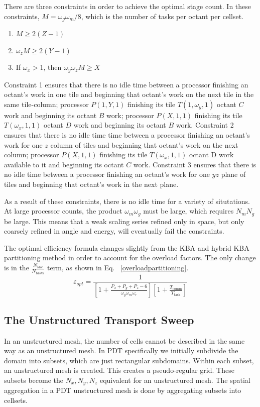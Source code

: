 \documentclass{anstrans}
\begin{document}
There are three constraints in order to achieve the optimal stage count. In these constraints, $M = \omega_g \omega_m/8$, which is the number of tasks per octant per cellset.
\begin{enumerate}
\item $ M \geq 2(Z-1)$
\item $\omega_z M \geq 2(Y-1)$
\item If $\omega_x > 1$, then $\omega_y \omega_z M \geq X$
\end{enumerate}
Constraint 1 ensures that there is no idle time between a processor finishing an octant's work in one tile and beginning that octant's work on the next tile in the same tile-column; processor $P(1,Y,1)$ finishing its tile $T(1,\omega_y,1)$ octant $C$ work and beginning its octant $B$ work; processor $P(X,1,1)$ finishing its tile $T(\omega_x,1,1)$ octant $D$ work and beginning its octant $B$ work. Constraint 2 ensures that there is no idle time time between a processor finishing an octant's work for one $z$ column of tiles and beginning that octant's work on the next column; processor $P(X,1,1)$ finishing its tile $T(\omega_x,1,1)$ octant D work available to it and beginning its octant $C$ work. Constraint 3 ensures that there is no idle time between a processor finishing an octant's work for one $yz$ plane of tiles and beginning that octant's work in the next plane.

As a result of these constraints, there is no idle time for a variety of situtations. At large processor counts, the product $\omega_m \omega_g$ must be large, which requires $N_m N_g$ be large. This means that a weak scaling series refined only in space, but only coarsely refined in angle and energy, will eventually fail the constraints.

The optimal efficiency formula changes slightly from the KBA and hybrid KBA partitioning method in order to account for the overload factors. The only change is in the $\frac{N_{idle}}{N_{tasks}}$ term, as shown in Eq. ~\eqref{overloadpartitioning}. 
\begin{equation}
\varepsilon_{opt} = \frac{1}{[1+\frac{P_x+P_y+P_z-6}{\omega_g \omega_m \omega_r}][1+\frac{T_{\text{comm}}}{T_{\text{task}}}]}
\label{overloadpartitioning}
\end{equation}


\subsection{The Unstructured Transport Sweep}
In an unstructured mesh, the number of cells cannot be described in the same way as an unstructured mesh. In PDT specifically we initially subdivide the domain into subsets, which are just rectangular subdomains. Within each subset, an unstructured mesh is created. This creates a pseudo-regular grid. These subsets become the $N_x, N_y, N_z$ equivalent for an unstructured mesh. The spatial aggregation in a PDT unstructured mesh is done by aggregating subsets into cellsets. 
\end{document}
